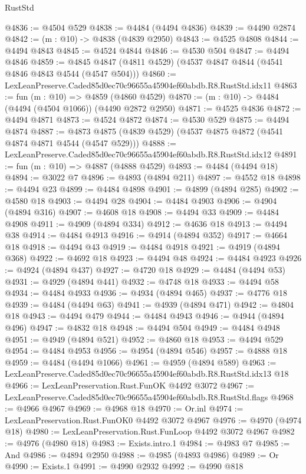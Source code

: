 \begin{lexlean}{RustStd}
\begin{coremodule}
@4836 := @4504 @529
@4838 := @4484 (@4494 @4836)
@4839 := @4490 @2874
@4842 := (m : @10) -> @4838 (@4839 @2950)
@4843 := @4525 @4808
@4844 := @4494 @4843
@4845 := @4524 @4844
@4846 := @4530 @504
@4847 := @4494 @4846
@4859 := @4845 @4847 (@4811 @4529) (@4537 @4847 @4844 (@4541 @4846 @4843 @4544 (@4547 @504)))
@4860 := LexLeanPreserve.Caded85d0ec70c96655a45904ef60abdb.R8.RustStd.idx11
@4863 := fun (m : @10) => @4859 (@4860 @4529)
@4870 := (m : @10) -> @4484 (@4494 (@4504 @1066)) (@4490 @2872 @2950)
@4871 := @4525 @4836
@4872 := @4494 @4871
@4873 := @4524 @4872
@4874 := @4530 @529
@4875 := @4494 @4874
@4887 := @4873 @4875 (@4839 @4529) (@4537 @4875 @4872 (@4541 @4874 @4871 @4544 (@4547 @529)))
@4888 := LexLeanPreserve.Caded85d0ec70c96655a45904ef60abdb.R8.RustStd.idx12
@4891 := fun (m : @10) => @4887 (@4888 @4529)
@4893 := @4484 (@4494 @18)
@4894 := @3022 @7
@4896 := @4893 (@4894 @211)
@4897 := @4552 @18
@4898 := @4494 @23
@4899 := @4484 @4898
@4901 := @4899 (@4894 @285)
@4902 := @4580 @18
@4903 := @4494 @28
@4904 := @4484 @4903
@4906 := @4904 (@4894 @316)
@4907 := @4608 @18
@4908 := @4494 @33
@4909 := @4484 @4908
@4911 := @4909 (@4894 @334)
@4912 := @4636 @18
@4913 := @4494 @38
@4914 := @4484 @4913
@4916 := @4914 (@4894 @352)
@4917 := @4664 @18
@4918 := @4494 @43
@4919 := @4484 @4918
@4921 := @4919 (@4894 @368)
@4922 := @4692 @18
@4923 := @4494 @48
@4924 := @4484 @4923
@4926 := @4924 (@4894 @437)
@4927 := @4720 @18
@4929 := @4484 (@4494 @53)
@4931 := @4929 (@4894 @441)
@4932 := @4748 @18
@4933 := @4494 @58
@4934 := @4484 @4933
@4936 := @4934 (@4894 @465)
@4937 := @4776 @18
@4939 := @4484 (@4494 @63)
@4941 := @4939 (@4894 @471)
@4942 := @4804 @18
@4943 := @4494 @479
@4944 := @4484 @4943
@4946 := @4944 (@4894 @496)
@4947 := @4832 @18
@4948 := @4494 @504
@4949 := @4484 @4948
@4951 := @4949 (@4894 @521)
@4952 := @4860 @18
@4953 := @4494 @529
@4954 := @4484 @4953
@4956 := @4954 (@4894 @546)
@4957 := @4888 @18
@4959 := @4484 (@4494 @1066)
@4961 := @4959 (@4894 @589)
@4963 := LexLeanPreserve.Caded85d0ec70c96655a45904ef60abdb.R8.RustStd.idx13 @18
@4966 := LexLeanPreservation.Rust.FunOK @4492 @3072
@4967 := LexLeanPreserve.Caded85d0ec70c96655a45904ef60abdb.R8.RustStd.flags
@4968 := @4966 @4967
@4969 := @4968 @18
@4970 := Or.inl
@4974 := LexLeanPreservation.Rust.FunOK0 @4492 @3072 @4967
@4976 := @4970 (@4974 @18)
@4980 := LexLeanPreservation.Rust.FunLoop @4492 @3072 @4967
@4982 := @4976 (@4980 @18)
@4983 := Exists.intro.{1}
@4984 := @4983 @7
@4985 := And
@4986 := @4894 @2950
@4988 := @4985 (@4893 @4986)
@4989 := Or
@4990 := Exists.{1}
@4991 := @4990 @2932
@4992 := @4990 @818

\end{coremodule}
\end{lexlean}
